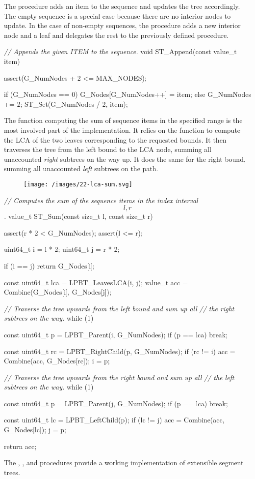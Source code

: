 \documentclass{article}
\begin{document}
The  procedure adds an item to the sequence and updates the tree accordingly.
The empty sequence is a special case because there are no interior nodes to update.
In the case of non-empty sequences, the procedure adds a new interior node and a leaf and delegates the rest to the previously defined  procedure.

\begin{code}[c]
\emph{// Appends the given ITEM to the sequence.}
void ST_Append(const value_t item) {
    assert(G_NumNodes + 2 <= MAX_NODES);

    if (G_NumNodes == 0) {
        G_Nodes[G_NumNodes++] = item;
    } else {
        G_NumNodes += 2;
        ST_Set(G_NumNodes / 2, item);
    }
}
\end{code}

The  function computing the sum of sequence items in the specified range is the most involved part of the implementation.
It relies on the  function to compute the LCA of the two leaves corresponding to the requested bounds.
It then traverses the tree from the left bound to the LCA node, summing all unaccounted \emph{right} subtrees on the way up.
It does the same for the right bound, summing all unaccounted \emph{left} subtrees on the path.

\begin{figure}[grayscale-diagram]
  \texttt{[image: /images/22-lca-sum.svg]}
\end{figure}

\begin{code}[c]
\emph{// Computes the sum of the sequence items in the index interval \[l, r\].}
value_t ST_Sum(const size_t l, const size_t r) {
    assert(r * 2 < G_NumNodes);
    assert(l <= r);

    uint64_t i = l * 2;
    uint64_t j = r * 2;

    if (i == j) return G_Nodes[i];

    const uint64_t lca = LPBT_LeavesLCA(i, j);
    value_t acc = Combine(G_Nodes[i], G_Nodes[j]);

    \emph{// Traverse the tree upwards from the left bound and sum up all}
    \emph{// the right subtrees on the way.}
    while (1) {
        const uint64_t p = LPBT_Parent(i, G_NumNodes);
        if (p == lca) break;

        const uint64_t rc = LPBT_RightChild(p, G_NumNodes);
        if (rc != i) acc = Combine(acc, G_Nodes[rc]);
        i = p;
    }
    \emph{// Traverse the tree upwards from the right bound and sum up all}
    \emph{// the left subtrees on the way.}
    while (1) {
        const uint64_t p = LPBT_Parent(j, G_NumNodes);
        if (p == lca) break;

        const uint64_t lc = LPBT_LeftChild(p);
        if (lc != j) acc = Combine(acc, G_Nodes[lc]);
        j = p;
    }
    return acc;
}
\end{code}

The , , and  procedures provide a working implementation of extensible segment trees.
\end{document}
